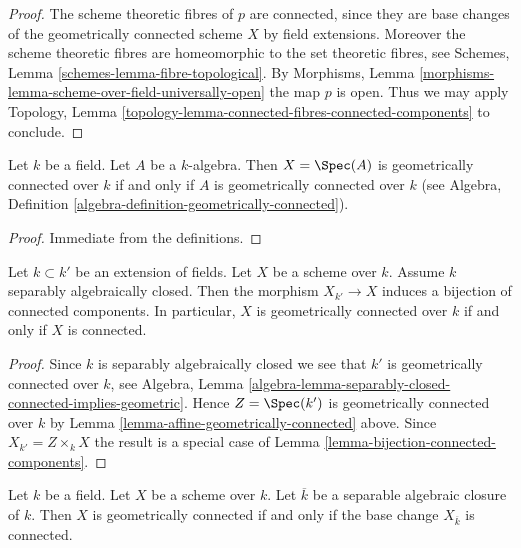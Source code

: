 \begin{proof}
The scheme theoretic fibres of $p$ are connected, since they
are base changes of the geometrically connected scheme $X$ by
field extensions. Moreover the scheme theoretic fibres are
homeomorphic to the set theoretic fibres, see
Schemes, Lemma \ref{schemes-lemma-fibre-topological}.
By
Morphisms, Lemma \ref{morphisms-lemma-scheme-over-field-universally-open}
the map $p$ is open.
Thus we may apply Topology,
Lemma \ref{topology-lemma-connected-fibres-connected-components}
to conclude.
\end{proof}

\begin{lemma}
\label{lemma-affine-geometrically-connected}
Let $k$ be a field.
Let $A$ be a $k$-algebra.
Then $X = \Spec(A)$ is geometrically connected over $k$
if and only if $A$ is geometrically connected over $k$ (see
Algebra, Definition \ref{algebra-definition-geometrically-connected}).
\end{lemma}

\begin{proof}
Immediate from the definitions.
\end{proof}

\begin{lemma}
\label{lemma-separably-closed-field-connected-components}
Let $k \subset k'$ be an extension of fields.
Let $X$ be a scheme over $k$.
Assume $k$ separably algebraically closed.
Then the morphism $X_{k'} \to X$ induces a bijection of connected
components. In particular, $X$ is geometrically connected over $k$
if and only if $X$ is connected.
\end{lemma}

\begin{proof}
Since $k$ is separably algebraically closed we see that
$k'$ is geometrically connected over $k$, see
Algebra,
Lemma \ref{algebra-lemma-separably-closed-connected-implies-geometric}.
Hence $Z = \Spec(k')$ is geometrically connected over $k$ by
Lemma \ref{lemma-affine-geometrically-connected}
above. Since $X_{k'} = Z \times_k X$ the result is a special case of
Lemma \ref{lemma-bijection-connected-components}.
\end{proof}

\begin{lemma}
\label{lemma-characterize-geometrically-connected}
Let $k$ be a field.
Let $X$ be a scheme over $k$.
Let $\overline{k}$ be a separable algebraic closure of $k$.
Then $X$ is geometrically connected if and only if the base change
$X_{\overline{k}}$ is connected.
\end{lemma}

